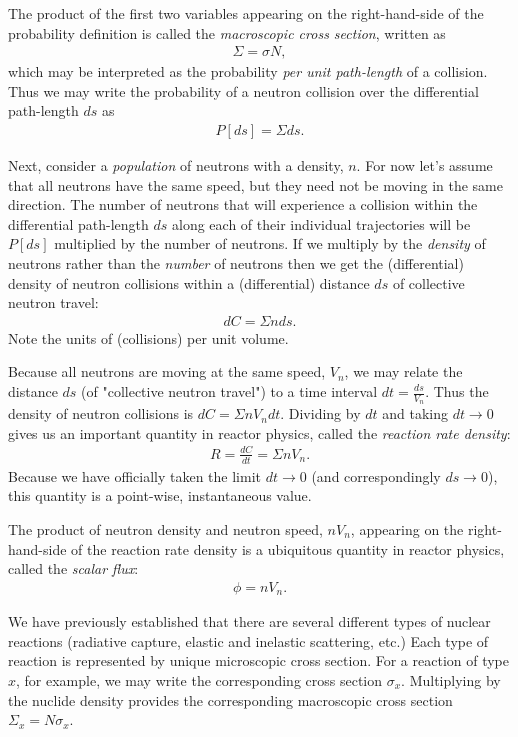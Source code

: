 \documentclass[11pt]{article}
\begin{document}
The product of the first two variables appearing on the right-hand-side of the probability definition is called the \emph{macroscopic cross section}, written as
\begin{align}
  \Sigma = \sigma N,
\end{align}
which may be interpreted as the probability \emph{per unit path-length} of a collision.  Thus we may write the probability of a neutron collision over the differential path-length \(ds\) as
\begin{align}
  P[ds] = \Sigma ds.
\end{align}

Next, consider a \emph{population} of neutrons with a density, \(n\).  For now let's assume that all neutrons have the same speed, but they need not be moving in the same direction.  The number of neutrons that will experience a collision within the differential path-length \(ds\) along each of their individual trajectories will be \(P[ds]\) multiplied by the number of neutrons.  If we multiply by the \emph{density} of neutrons rather than the \emph{number} of neutrons then we get the (differential) density of neutron collisions within a (differential) distance \(ds\) of collective neutron travel:
\begin{align}
  dC = \Sigma n ds.
\end{align}
Note the units of (collisions) per unit volume.

Because all neutrons are moving at the same speed, \(V_n\), we may relate the distance \(ds\) (of "collective neutron travel") to a time interval \(dt = \frac{ds}{V_n}\).  Thus the density of neutron collisions is \(dC = \Sigma n V_n dt\).  Dividing by \(dt\) and taking \(dt \rightarrow 0\) gives us an important quantity in reactor physics, called the \emph{reaction rate density}:
\begin{align}
  R = \frac{dC}{dt} = \Sigma n V_n.
\end{align}
Because we have officially taken the limit \(dt \rightarrow 0\) (and correspondingly \(ds \rightarrow 0\)), this quantity is a point-wise, instantaneous value.

The product of neutron density and neutron speed, \(n V_n\), appearing on the right-hand-side of the reaction rate density is a ubiquitous quantity in reactor physics, called the \emph{scalar flux}:
\begin{align}
  \phi = n V_n.
\end{align}

We have previously established that there are several different types of nuclear reactions (radiative capture, elastic and inelastic scattering, etc.)  Each type of reaction is represented by unique microscopic cross section.  For a reaction of type \(x\), for example, we may write the corresponding cross section \(\sigma_x\).  Multiplying by the nuclide density provides the corresponding macroscopic cross section \(\Sigma_x = N \sigma_x\).
\end{document}
